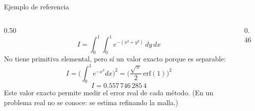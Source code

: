 \documentclass[aspectratio=169,10pt]{beamer}
\begin{document}
\begin{frame}{Ejemplo de referencia}
\begin{columns}[T]
\begin{column}{0.50\textwidth}
\small
\[
I=\int_0^1\!\!\int_0^1 e^{-(x^2+y^2)}\,dy\,dx
\]
No tiene primitiva elemental, pero s\'i un valor exacto porque es separable:
\[
I=\Big(\int_0^1 e^{-x^2}dx\Big)^2=\Big(\frac{\sqrt\pi}{2}\,\mathrm{erf}(1)\Big)^2
\]
\[
I=0.557\,746\,285\,4
\]
Este valor exacto permite medir el \alert{error real} de cada m\'etodo. (En un problema real no se conoce: se estima refinando la malla.)
\end{column}
\begin{column}{0.46\textwidth}
\centering
{}
\end{column}
\end{columns}
\end{frame}
\end{document}
